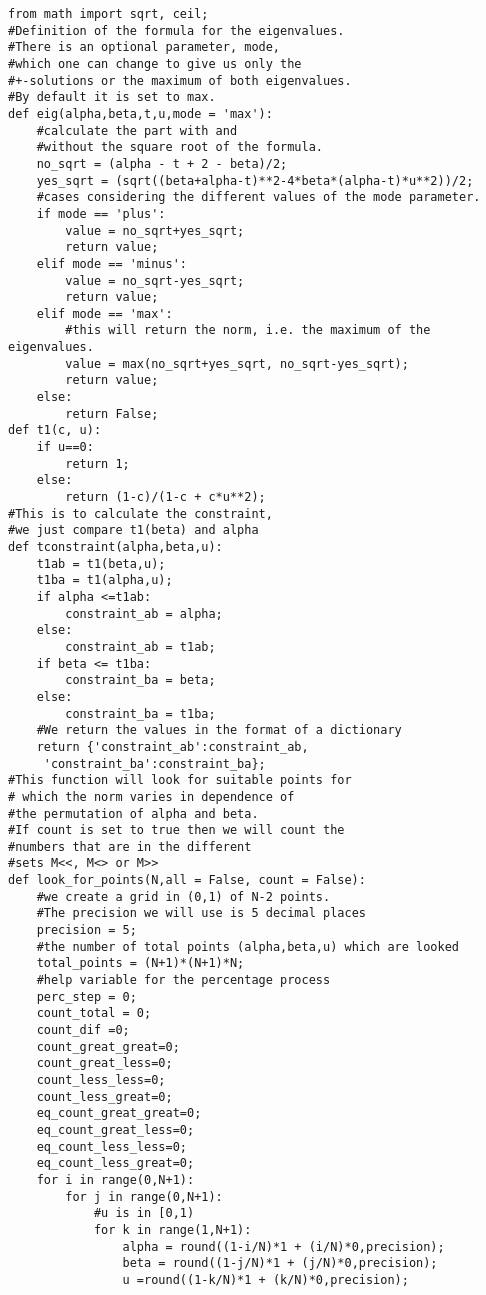{\small\begin{verbatim}
from math import sqrt, ceil;
#Definition of the formula for the eigenvalues. 
#There is an optional parameter, mode, 
#which one can change to give us only the 
#+-solutions or the maximum of both eigenvalues. 
#By default it is set to max. 
def eig(alpha,beta,t,u,mode = 'max'):
    #calculate the part with and 
    #without the square root of the formula.
    no_sqrt = (alpha - t + 2 - beta)/2;
    yes_sqrt = (sqrt((beta+alpha-t)**2-4*beta*(alpha-t)*u**2))/2;
    #cases considering the different values of the mode parameter.
    if mode == 'plus':
        value = no_sqrt+yes_sqrt;
        return value;
    elif mode == 'minus':
        value = no_sqrt-yes_sqrt;
        return value;
    elif mode == 'max':
        #this will return the norm, i.e. the maximum of the eigenvalues. 
        value = max(no_sqrt+yes_sqrt, no_sqrt-yes_sqrt);
        return value;
    else:
        return False;
def t1(c, u):
    if u==0:
        return 1;
    else:
        return (1-c)/(1-c + c*u**2);
#This is to calculate the constraint, 
#we just compare t1(beta) and alpha
def tconstraint(alpha,beta,u):
    t1ab = t1(beta,u);
    t1ba = t1(alpha,u);
    if alpha <=t1ab:
        constraint_ab = alpha;
    else:
        constraint_ab = t1ab;
    if beta <= t1ba:
        constraint_ba = beta;
    else:
        constraint_ba = t1ba;
    #We return the values in the format of a dictionary
    return {'constraint_ab':constraint_ab,
     'constraint_ba':constraint_ba};
#This function will look for suitable points for
# which the norm varies in dependence of 
#the permutation of alpha and beta. 
#If count is set to true then we will count the 
#numbers that are in the different 
#sets M<<, M<> or M>>
def look_for_points(N,all = False, count = False):
    #we create a grid in (0,1) of N-2 points. 
    #The precision we will use is 5 decimal places
    precision = 5;
    #the number of total points (alpha,beta,u) which are looked
    total_points = (N+1)*(N+1)*N;
    #help variable for the percentage process
    perc_step = 0;
    count_total = 0;
    count_dif =0;
    count_great_great=0;
    count_great_less=0;
    count_less_less=0;
    count_less_great=0;
    eq_count_great_great=0;
    eq_count_great_less=0;
    eq_count_less_less=0;
    eq_count_less_great=0;
    for i in range(0,N+1):
        for j in range(0,N+1):
            #u is in [0,1)
            for k in range(1,N+1):
                alpha = round((1-i/N)*1 + (i/N)*0,precision);
                beta = round((1-j/N)*1 + (j/N)*0,precision);
                u =round((1-k/N)*1 + (k/N)*0,precision);

\end{verbatim}}
